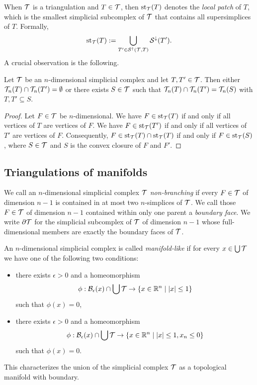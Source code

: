 \documentclass[a4paper]{amsart}
\begin{document}
When ${\mathcal T}$ is a triangulation and $T \in {\mathcal T}$, then $\operatorname{st}_{{\mathcal T}}(T)$ denotes the \emph{local patch} of $T$, which is the smallest simplicial subcomplex of ${\mathcal T}$ that contains all supersimplices of $T$. Formally,
\begin{gather*}
    \operatorname{st}_{{\mathcal T}}(T) := \bigcup_{ T' \in {\mathcal S}^{\uparrow}({\mathcal T},T) } {\mathcal S}^{\downarrow}(T').
\end{gather*}
A crucial observation is the following.

\begin{lemma}
 Let ${\mathcal T}$ be an $n$-dimensional simplicial complex and let $T,T' \in {\mathcal T}$.
 Then either ${\mathcal T}_{n}(T) \cap {\mathcal T}_{n}(T') = \emptyset$ or there exists $S \in {\mathcal T}$
 such that ${\mathcal T}_{n}(T) \cap {\mathcal T}_{n}(T') = {\mathcal T}_{n}(S)$ with $T, T' \subseteq S$.
\end{lemma}
\begin{proof}
 Let $F \in {\mathcal T}$ be $n$-dimensional.
 We have $F \in \operatorname{st}_{{\mathcal T}}(T )$ if and only if all vertices of $T $ are vertices of $F$.
 We have $F \in \operatorname{st}_{{\mathcal T}}(T')$ if and only if all vertices of $T'$ are vertices of $F$.
 Consequently, $F \in \operatorname{st}_{{\mathcal T}}(T) \cap \operatorname{st}_{{\mathcal T}}(T)$ if and only if $F \in \operatorname{st}_{{\mathcal T}}(S)$,
 where $S \in {\mathcal T}$ and $S$ is the convex closure of $F$ and $F'$.
\end{proof}




\subsection{Triangulations of manifolds}

We call an $n$-dimensional simplicial complex ${\mathcal T}$ \emph{non-branching} if every $F \in {\mathcal T}$ of dimension $n-1$ is contained in at most two $n$-simplices of ${\mathcal T}$. We call those $F \in {\mathcal T}$ of dimension $n-1$ contained within only one parent a \emph{boundary face}.
We write $\partial{\mathcal T}$ for the simplicial subcomplex of ${\mathcal T}$ of dimension $n-1$ 
whose full-dimensional members are exactly the boundary faces of ${\mathcal T}$.

An $n$-dimensional simplicial complex is called \emph{manifold-like} if for every $x \in \bigcup {\mathcal T}$
we have one of the following two conditions:
\begin{itemize}
 \item 
 there exists $\epsilon > 0$ 
 and a homeomorphism 
 \begin{align*}
    \phi : \Ball_\epsilon(x) \cap \bigcup\calT  
    \rightarrow 
    \left\{ x \in \bbR^{n} \suchthat |x| \leq 1 \right\}
 \end{align*}
 such that $\phi(x) = 0$,
 \item 
 there exists $\epsilon > 0$ and a homeomorphism 
 \begin{align*}
    \phi : \Ball_\epsilon(x) \cap \bigcup\calT 
    \rightarrow 
    \left\{ x \in \bbR^{n} \suchthat |x| \leq 1, x_n \leq 0 \right\}
 \end{align*}
 such that $\phi(x) = 0$.
\end{itemize}
This characterizes the union of the simplicial complex ${\mathcal T}$ as a topological manifold with boundary. 
\end{document}
